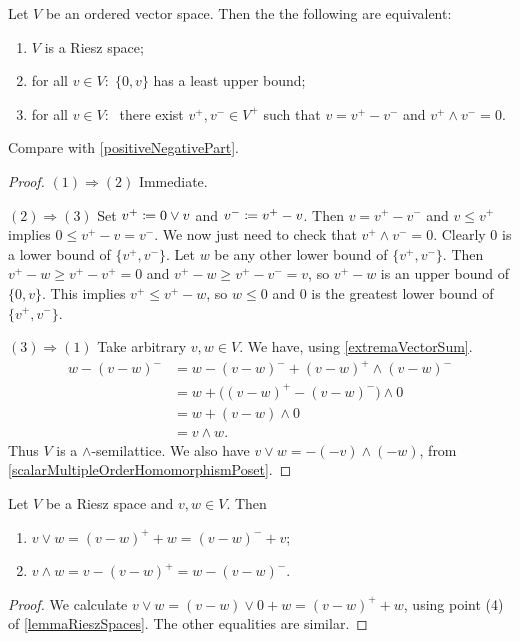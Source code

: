 \begin{lemma} \label{positiveNegativePartRieszSpace}
Let $V$ be an ordered vector space. Then the the following are equivalent:
\begin{enumerate}
\item $V$ is a Riesz space;
\item for all $v\in V: \;\{0,v\}$ has a least upper bound;
\item for all $v\in V: \;$ there exist $v^+, v^- \in V^+$ such that $v = v^+ - v^-$ and $v^+\wedge v^- = 0$.
\end{enumerate}
\end{lemma}
Compare with \ref{positiveNegativePart}.
\begin{proof}
$(1) \Rightarrow (2)$ Immediate.

$(2) \Rightarrow (3)$ Set $v^+ \coloneqq 0\vee v$ and $v^- \coloneqq v^+ - v$. Then $v = v^+ - v^-$ and $v\leq v^+$ implies $0 \leq v^+ - v = v^-$. We now just need to check that $v^+\wedge v^- = 0$. Clearly $0$ is a lower bound of $\{v^+, v^-\}$. Let $w$ be any other lower bound of $\{v^+, v^-\}$.
Then $v^+ - w \geq v^+ - v^+ = 0$ and $v^+ - w \geq v^+ - v^- = v$, so $v^+ - w$ is an upper bound of $\{0, v\}$. This implies $v^+ \leq v^+ - w$, so $w\leq 0$ and $0$ is the greatest lower bound of $\{v^+, v^-\}$.

$(3) \Rightarrow (1)$ Take arbitrary $v,w\in V$. We have, using \ref{extremaVectorSum}.
\begin{align*}
w - (v-w)^- &= w - (v-w)^- + (v-w)^+\wedge (v-w)^- \\
&= w + \big((v-w)^+- (v-w)^-\big)\wedge 0 \\
&= w + (v-w)\wedge 0 \\
&= v\wedge w.
\end{align*}
Thus $V$ is a $\wedge$-semilattice. We also have $v\vee w = -(-v)\wedge(-w)$, from \ref{scalarMultipleOrderHomomorphismPoset}.
\end{proof}

\begin{lemma} \label{MeetJoinAsPositiveNegative}
Let $V$ be a Riesz space and $v,w\in V$. Then
\begin{enumerate}
\item $v\vee w = (v-w)^+ + w = (v-w)^- + v$;
\item $v\wedge w = v - (v-w)^+ = w - (v-w)^-$.
\end{enumerate}
\end{lemma}
\begin{proof}
We calculate $v\vee w = (v-w)\vee 0 + w = (v-w)^+ + w$, using point (4) of \ref{lemmaRieszSpaces}. The other equalities are similar.
\end{proof}


